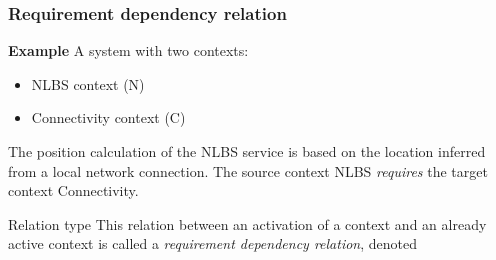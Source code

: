 \documentclass{beamer}
\begin{document}
\begin{frame}[noframenumbering]
	\frametitle{Requirement dependency relation}

	\textbf{Example} A system with two contexts:

	\begin{itemize}
		\item NLBS context (N)
		\item Connectivity context (C)
	\end{itemize}

	The position calculation of the NLBS service is based on the location inferred
	from a local network connection. The source context NLBS \emph{requires} the
	target context Connectivity.

	\begin{exampleblock}{Relation type}
		This relation between an activation of a context and an already active context
		is called a \emph{requirement dependency relation},
		denoted 
	\end{exampleblock}
\end{frame}
\end{document}
